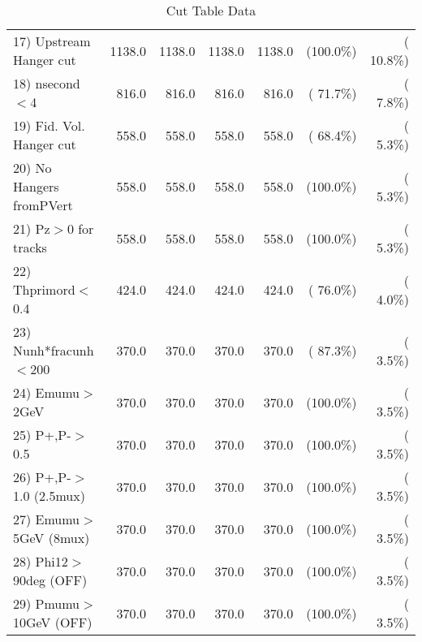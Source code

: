 \begin{table}[h!]
\begin{tabular}{||l||r|r|r|r|r|r||}
 17) Upstream Hanger cut  &       1138.0 &       1138.0 &       1138.0 &       1138.0 & (100.0\%) & ( 10.8\%) \\
 18) nsecond$<$4          &        816.0 &        816.0 &        816.0 &        816.0 & ( 71.7\%) & (  7.8\%) \\
 19) Fid. Vol. Hanger cut &        558.0 &        558.0 &        558.0 &        558.0 & ( 68.4\%) & (  5.3\%) \\
 20) No Hangers fromPVert &        558.0 &        558.0 &        558.0 &        558.0 & (100.0\%) & (  5.3\%) \\
 21) Pz$>$0 for tracks    &        558.0 &        558.0 &        558.0 &        558.0 & (100.0\%) & (  5.3\%) \\
 22) Thprimord$<$0.4      &        424.0 &        424.0 &        424.0 &        424.0 & ( 76.0\%) & (  4.0\%) \\
 23) Nunh*fracunh$<$200   &        370.0 &        370.0 &        370.0 &        370.0 & ( 87.3\%) & (  3.5\%) \\
 24) Emumu$>$2GeV         &        370.0 &        370.0 &        370.0 &        370.0 & (100.0\%) & (  3.5\%) \\
 25) P+,P-$>$0.5          &        370.0 &        370.0 &        370.0 &        370.0 & (100.0\%) & (  3.5\%) \\
 26) P+,P-$>$1.0 (2.5mux) &        370.0 &        370.0 &        370.0 &        370.0 & (100.0\%) & (  3.5\%) \\
 27) Emumu$>$5GeV  (8mux) &        370.0 &        370.0 &        370.0 &        370.0 & (100.0\%) & (  3.5\%) \\
 28) Phi12$>$90deg  (OFF) &        370.0 &        370.0 &        370.0 &        370.0 & (100.0\%) & (  3.5\%) \\
 29) Pmumu$>$10GeV  (OFF) &        370.0 &        370.0 &        370.0 &        370.0 & (100.0\%) & (  3.5\%) \\
 \hline
 \hline
 \end{tabular}
 \caption{Cut Table  Data     }
 \label{tab-cutcohjpsi-mumu_data}
 \end{table}

